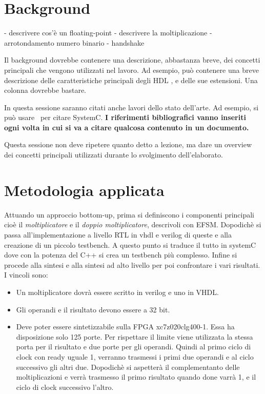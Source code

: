 \documentclass[]{IEEEtran}
\begin{document}
\section{Background}

- descrivere cos'è un floating-point
- descrivere la moltiplicazione
- arrotondamento numero binario
- handshake

Il background dovrebbe contenere una descrizione, abbastanza breve, dei concetti principali che vengono utilizzati nel lavoro. Ad esempio, può contenere una breve descrizione delle caratteristiche principali degli HDL , e delle sue estensioni. Una colonna dovrebbe bastare.

In questa sessione saranno citati anche lavori dello stato dell'arte. Ad esempio, si può usare~\cite{SystemC} per citare SystemC. \textbf{I riferimenti bibliografici vanno inseriti ogni volta in cui si va a citare qualcosa contenuto in un documento.}

Questa sessione non deve ripetere quanto detto a lezione, ma dare un overview dei concetti principali utilizzati durante lo svolgimento dell'elaborato.


\section{Metodologia applicata}
Attuando un approccio bottom-up, prima si definiscono i componenti principali cioè il {\it moltiplicatore} e il {\it doppio moltiplicatore}, descrivoli con EFSM. Dopodichè si passa all'implementazione a livello RTL in vhdl e verilog di queste e alla creazione di un piccolo testbench. A questo punto si traduce il tutto in systemC dove con la potenza del C++ si crea un testbench più complesso. Infine si procede alla sintesi e alla sintesi ad alto livello per poi confrontare i vari risultati.\\

I vincoli sono:
\begin{itemize}
\item Un moltiplicatore dovrà essere scritto in verilog e uno in VHDL.
\item Gli operandi e il risultato devono essere a 32 bit.
\item Deve poter essere sintetizzabile sulla FPGA xc7z020clg400-1. Essa ha disposizione solo 125 porte. Per rispettare il limite viene utilizzata la stessa porta per il risultato e due porte per gli operandi. Quindi al primo ciclo di clock con ready uguale 1, verranno trasmessi i primi due operandi e al ciclo successivo gli altri due. Dopodichè si aspetterà il complementanto delle moltiplicazioni e verrà trasmesso il primo risultato quando done varrà 1, e il ciclo di clock successivo l'altro.
\end{itemize}
\end{document}
